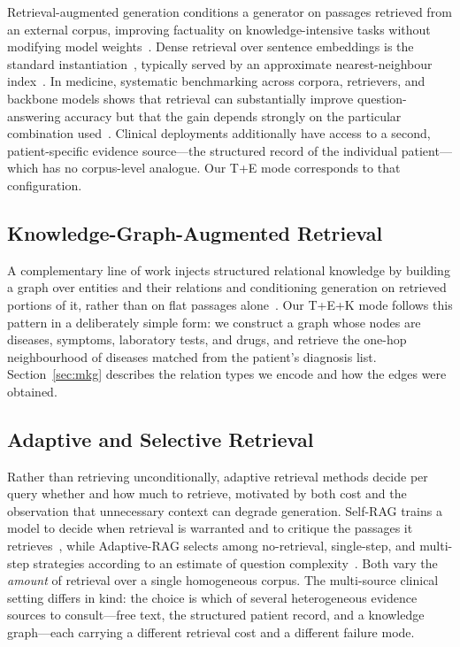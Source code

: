 \documentclass[conference]{IEEEtran}
\begin{document}
Retrieval-augmented generation conditions a generator on passages
retrieved from an external corpus, improving factuality on
knowledge-intensive tasks without modifying model
weights~\cite{lewis2020}. Dense retrieval over sentence embeddings is
the standard instantiation~\cite{reimers2019}, typically served by an
approximate nearest-neighbour index~\cite{johnson2019}. In medicine, systematic benchmarking across
corpora, retrievers, and backbone models shows that retrieval can
substantially improve question-answering accuracy but that the gain
depends strongly on the particular combination
used~\cite{xiong2024}. Clinical deployments additionally have access
to a second, patient-specific evidence source---the structured record
of the individual patient---which has no corpus-level analogue. Our
T+E mode corresponds to that configuration.

\subsection{Knowledge-Graph-Augmented Retrieval}

A complementary line of work injects structured relational knowledge
by building a graph over entities and their relations and conditioning
generation on retrieved portions of it, rather than on flat passages
alone~\cite{edge2024}. Our T+E+K mode follows this pattern in a
deliberately simple form: we construct a graph whose nodes are
diseases, symptoms, laboratory tests, and drugs, and retrieve the
one-hop neighbourhood of diseases matched from the patient's diagnosis
list. Section~\ref{sec:mkg} describes the relation types we encode and
how the edges were obtained.

\subsection{Adaptive and Selective Retrieval}

Rather than retrieving unconditionally, adaptive retrieval methods
decide per query whether and how much to retrieve, motivated by both
cost and the observation that unnecessary context can degrade
generation. Self-RAG trains a model to decide when retrieval is
warranted and to critique the passages it
retrieves~\cite{asai2024}, while Adaptive-RAG selects among
no-retrieval, single-step, and multi-step strategies according to an
estimate of question complexity~\cite{jeong2024}. Both vary the
\textit{amount} of retrieval over a single homogeneous corpus. The
multi-source clinical setting differs in kind: the choice is which of
several heterogeneous evidence sources to consult---free text, the
structured patient record, and a knowledge graph---each carrying a
different retrieval cost and a different failure mode.
\end{document}
